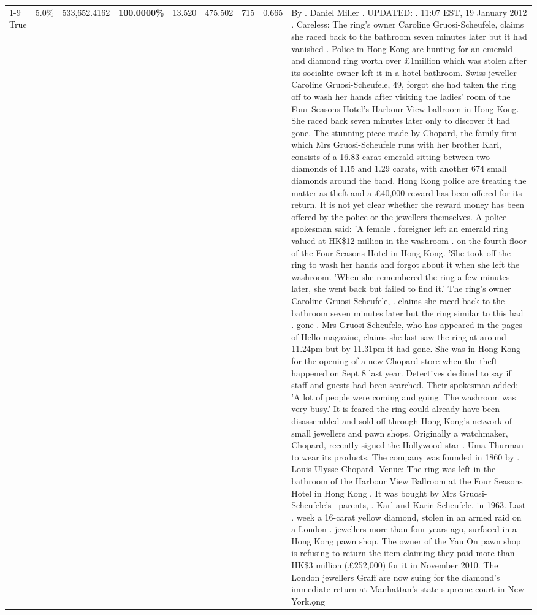 \begin{table}[H]
\begin{tabular}{lllrlllll}
\cline{1-9}
True & 5.0\% & 533,652.4162 & \bfseries \color{red} 100.0000\% & 13.520 & 475.502 & 715 & 0.665 & By . Daniel Miller . UPDATED: . 11:07 EST, 19 January 2012 . Careless: The ring's owner Caroline Gruosi-Scheufele, claims she raced back to the bathroom seven minutes later but it had vanished . Police in Hong Kong are hunting for an emerald and diamond ring worth over £1million which was stolen after its socialite owner left it in a hotel bathroom. Swiss jeweller Caroline Gruosi-Scheufele, 49, forgot she had taken the ring off to wash her hands after visiting the ladies' room of the Four Seasons Hotel's Harbour View ballroom in Hong Kong. She raced back seven minutes later only to discover it had gone. The stunning piece made by Chopard, the family firm which Mrs Gruosi-Scheufele runs with her brother Karl, consists of a 16.83 carat emerald sitting between two diamonds of 1.15 and 1.29 carats, with another 674 small diamonds around the band. Hong Kong police are treating the matter as theft and a £40,000 reward has been offered for its return. It is not yet clear whether the reward money has been offered by the police or the jewellers themselves. A police spokesman said: 'A female . foreigner left an emerald ring valued at HK\$12 million in the washroom . on the fourth floor of the Four Seasons Hotel in Hong Kong. 'She took off the ring to wash her hands and forgot about it when she left the washroom. 'When she remembered the ring a few minutes later, she went back but failed to find it.' The ring's owner Caroline Gruosi-Scheufele, . claims she raced back to the bathroom seven minutes later but the ring similar to this had . gone . Mrs Gruosi-Scheufele, who has appeared in the pages of Hello magazine, claims she last saw the ring at around 11.24pm but by 11.31pm it had gone. She was in Hong Kong for the opening of a new Chopard store when the theft happened on Sept 8 last year. Detectives declined to say if staff and guests had been searched. Their spokesman added: 'A lot of people were coming and going. The washroom was very busy.' It is feared the ring could already have been disassembled and sold off through Hong Kong's network of small jewellers and pawn shops. Originally a watchmaker, Chopard, recently signed the Hollywood star . Uma Thurman to wear its products. The company was founded in 1860 by . Louis-Ulysse Chopard. Venue: The ring was left in the bathroom of the Harbour View Ballroom at the Four Seasons Hotel in Hong Kong . It was bought by Mrs Gruosi-Scheufele's  parents, . Karl and Karin Scheufele, in 1963. Last . week a 16-carat yellow diamond, stolen in an armed raid on a London . jewellers more than four years ago, surfaced in a Hong Kong pawn shop. The owner of the Yau On pawn shop is refusing to return the item claiming they paid more than HK\$3 million (£252,000) for it in November 2010. The London jewellers Graff are now suing for the diamond’s immediate return at Manhattan’s state supreme court in New York.ọng \\

\end{tabular}
\end{table}
